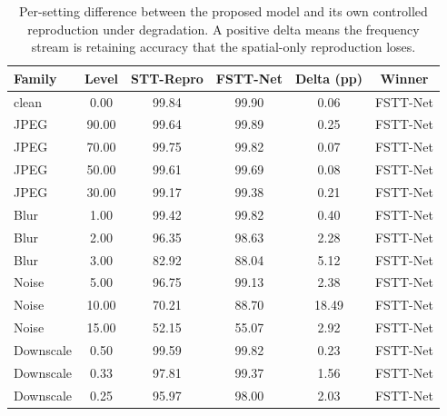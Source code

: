 \begin{table}[!t]
\centering
\caption{Per-setting difference between the proposed model and its own controlled reproduction under degradation. A positive delta means the frequency stream is retaining accuracy that the spatial-only reproduction loses.}
\label{tab:tableXa_robustness_delta}
\footnotesize
\begin{tabular}{lccccc}
\hline\hline
Family & Level & STT-Repro & FSTT-Net & Delta (pp) & Winner \\
\hline
clean & 0.00 & 99.84 & 99.90 & 0.06 & FSTT-Net \\
JPEG & 90.00 & 99.64 & 99.89 & 0.25 & FSTT-Net \\
JPEG & 70.00 & 99.75 & 99.82 & 0.07 & FSTT-Net \\
JPEG & 50.00 & 99.61 & 99.69 & 0.08 & FSTT-Net \\
JPEG & 30.00 & 99.17 & 99.38 & 0.21 & FSTT-Net \\
Blur & 1.00 & 99.42 & 99.82 & 0.40 & FSTT-Net \\
Blur & 2.00 & 96.35 & 98.63 & 2.28 & FSTT-Net \\
Blur & 3.00 & 82.92 & 88.04 & 5.12 & FSTT-Net \\
Noise & 5.00 & 96.75 & 99.13 & 2.38 & FSTT-Net \\
Noise & 10.00 & 70.21 & 88.70 & 18.49 & FSTT-Net \\
Noise & 15.00 & 52.15 & 55.07 & 2.92 & FSTT-Net \\
Downscale & 0.50 & 99.59 & 99.82 & 0.23 & FSTT-Net \\
Downscale & 0.33 & 97.81 & 99.37 & 1.56 & FSTT-Net \\
Downscale & 0.25 & 95.97 & 98.00 & 2.03 & FSTT-Net \\
\hline\hline
\end{tabular}
\end{table}
